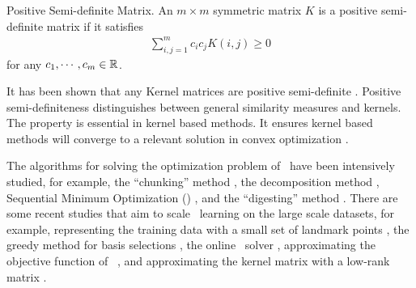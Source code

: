 {%
\begin{definition}{Positive Semi-definite Matrix.}
	An $m\times m$ symmetric matrix $K$ is a positive semi-definite matrix if it satisfies 
	\begin{align*}
		\sum_{i,j=1}^{m}c_ic_jK(i,j)\ge0
		\end{align*} 
		for any $c_1,\cdots,c_m\in\mathbb{R}$.
\end{definition}
\noindent
It has been shown that any Kernel matrices are positive semi-definite \citep{Taylor04kernel}.
Positive semi-definiteness distinguishes between general similarity measures and kernels.
The property is essential in kernel based methods.
It ensures kernel based methods will converge to a relevant solution in convex optimization \citep{Boyd2004convex}.





The algorithms for solving the optimization problem of \svm\ have been intensively studied, for example, 
the ``chunking'' method \citep{Vapnik82estimation,Perezcruz04double}, 
the decomposition method \citep{Osuna97an,Joachims98making}, 
{Sequential Minimum Optimization} (\smo) \citep{Platt98sequential,Platt99fast}, 
and the ``digesting'' method \citep{Decoste02support}.
There are some recent studies that aim to scale \svm\ learning on the large scale datasets, for example, 
representing the training data with a small set of landmark points \citep{Pavlov00towards,Boley04training,Yu05making,Zhang08improved}, 
the greedy method for basis selections \citep{Keerthi06building}, 
the online \svm\ solver \citep{Bordes05fast}, 
approximating the objective function of \svm\ \citep{Zhang12scaling, Le13fast}, 
and approximating the kernel matrix with a low-rank matrix \citep{Smola00sparse,Fine02efficient,Drineas05on,Si14memory}.



}
